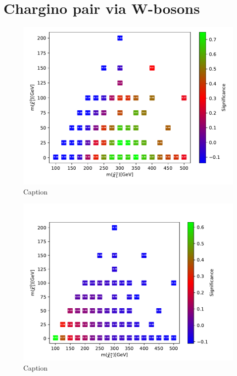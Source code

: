 \section{Chargino pair via W-bosons}
\label{sec:resC1C1_WW}
\begin{figure}[H]
    \centering
    \includegraphics[width = \textwidth]{Figures/Significances/significanceCutandCount_WW_all.pdf}
    \caption{Caption}
    \label{fig:my_label}
\end{figure}



\begin{figure}
    \centering
    \includegraphics[width = \textwidth]{Figures/Significances/significance_BDT_WW_All_level.pdf}
    \caption{Caption}
    \label{fig:my_label}
\end{figure}

